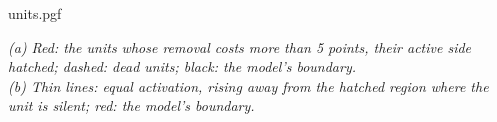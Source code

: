\documentclass[border=10pt]{standalone}
\begin{document}
\begin{figurecanvas}
{units.pgf}\par\smallskip
{\footnotesize\itshape\color{soft}
(a) Red: the units whose removal costs more than 5 points, their active side hatched; dashed: dead units; black: the model's boundary.\\
(b) Thin lines: equal activation, rising away from the hatched region where the unit is silent; red: the model's boundary.\par}
\end{figurecanvas}
\end{document}
